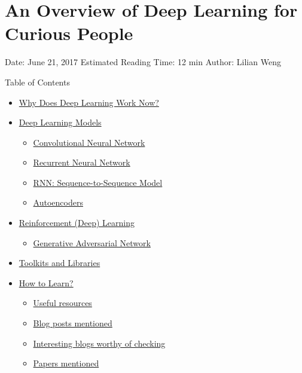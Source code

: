 \section{An Overview of Deep Learning for Curious People}\label{an-overview-of-deep-learning-for-curious-people}

Date: June 21, 2017 \textbar{} Estimated Reading Time: 12 min \textbar{} Author: Lilian Weng

{Table of Contents}

\begin{itemize}
\tightlist
\item
  \hyperref[why-does-deep-learning-work-now]{Why Does Deep Learning Work Now?}
\item
  \hyperref[deep-learning-models]{Deep Learning Models}

  \begin{itemize}
  \tightlist
  \item
    \hyperref[convolutional-neural-network]{Convolutional Neural Network}
  \item
    \hyperref[recurrent-neural-network]{Recurrent Neural Network}
  \item
    \hyperref[rnn-sequence-to-sequence-model]{RNN: Sequence-to-Sequence Model}
  \item
    \hyperref[autoencoders]{Autoencoders}
  \end{itemize}
\item
  \hyperref[reinforcement-deep-learning]{Reinforcement (Deep) Learning}

  \begin{itemize}
  \tightlist
  \item
    \hyperref[generative-adversarial-network]{Generative Adversarial Network}
  \end{itemize}
\item
  \hyperref[toolkits-and-libraries]{Toolkits and Libraries}
\item
  \hyperref[how-to-learn]{How to Learn?}

  \begin{itemize}
  \tightlist
  \item
    \hyperref[useful-resources]{Useful resources}
  \item
    \hyperref[blog-posts-mentioned]{Blog posts mentioned}
  \item
    \hyperref[interesting-blogs-worthy-of-checking]{Interesting blogs worthy of checking}
  \item
    \hyperref[papers-mentioned]{Papers mentioned}
  \end{itemize}
\end{itemize}

